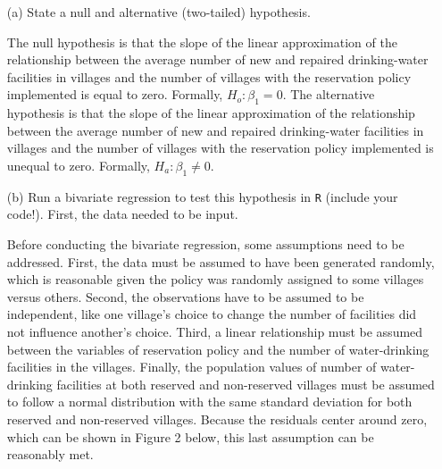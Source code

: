 \documentclass[12pt,letterpaper]{article}
\begin{document}
\newpage
\begin{enumerate}
	\item [(a)] State a null and alternative (two-tailed) hypothesis. 
	
	The null hypothesis is that the slope of the linear approximation of the relationship between the average number of new and repaired drinking-water facilities in villages and the number of villages with the reservation policy implemented is equal to zero. Formally, $H_o: \beta_1 = 0 $.
	The alternative hypothesis is that the slope of the linear approximation of the relationship between the average number of new and repaired drinking-water facilities in villages and the number of villages with the reservation policy implemented is unequal to zero. Formally, $H_a: \beta_1 \neq 0 $.
	
	\vspace{.5cm}
	
	\item [(b)] Run a bivariate regression to test this hypothesis in \texttt{R} (include your code!).
	First, the data needed to be input.
	
	 
	
	Before conducting the bivariate regression, some assumptions need to be addressed. First, the data must be assumed to have been generated randomly, which is reasonable given the policy was randomly assigned to some villages versus others. Second, the observations have to be assumed to be independent, like one village's choice to change the number of facilities did not influence another's choice. Third, a linear relationship must be assumed between the variables of reservation policy and the number of water-drinking facilities in the villages. Finally, the population values of number of water-drinking facilities at both reserved and non-reserved villages must be assumed to follow a normal distribution with the same standard deviation for both reserved and non-reserved villages. Because the residuals center around zero, which can be shown in Figure 2 below, this last assumption can be reasonably met.
	
	 
	\vspace{.5cm}
	

\end{enumerate}
\end{document}
